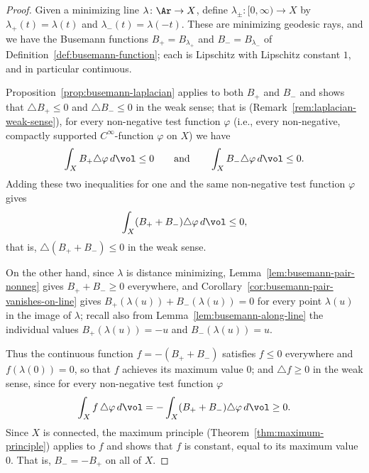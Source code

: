 \begin{proof}
Given a minimizing line $\lambda\colon \Ar\to X$, define
$\lambda_\pm\colon [0,\infty)\to X$ by $\lambda_+(t)=\lambda(t)$ and
$\lambda_-(t)=\lambda(-t)$. These are minimizing geodesic rays, and we have
the Busemann functions $B_+=B_{\lambda_+}$ and $B_-=B_{\lambda_-}$ of
Definition~\ref{def:busemann-function}; each is Lipschitz with Lipschitz
constant $1$, and in particular continuous.

Proposition~\ref{prop:busemann-laplacian} applies to both $B_+$ and $B_-$
and shows that $\triangle B_+\le 0$ and $\triangle B_-\le 0$ in the weak sense;
that is (Remark~\ref{rem:laplacian-weak-sense}), for every non-negative
test function $\varphi$ (i.e., every non-negative, compactly supported
$C^\infty$-function $\varphi$ on $X$) we have
$$\int_X B_+\triangle\varphi\,d\vol\le 0
\qquad\text{and}\qquad
\int_X B_-\triangle\varphi\,d\vol\le 0.$$
Adding these two inequalities for one and the same non-negative test
function $\varphi$ gives
$$\int_X (B_++B_-)\triangle\varphi\,d\vol\le 0,$$
that is, $\triangle(B_++B_-)\le 0$ in the weak sense.

On the other hand, since $\lambda$ is distance minimizing,
Lemma~\ref{lem:busemann-pair-nonneg} gives $B_++B_-\ge 0$
everywhere, and
Corollary~\ref{cor:busemann-pair-vanishes-on-line} gives
$B_+(\lambda(u))+B_-(\lambda(u))=0$ for every point $\lambda(u)$ in
the image of $\lambda$; recall also from
Lemma~\ref{lem:busemann-along-line} the individual values
$B_+(\lambda(u))=-u$ and $B_-(\lambda(u))=u$.

Thus the continuous function $f=-(B_++B_-)$ satisfies $f\le 0$ everywhere
and $f(\lambda(0))=0$, so that $f$ achieves its maximum value $0$; and
$\triangle f\ge 0$ in the weak sense, since for every non-negative test
function $\varphi$
$$\int_X f\,\triangle\varphi\,d\vol
=-\int_X (B_++B_-)\triangle\varphi\,d\vol\ge 0.$$
Since $X$ is connected, the maximum principle
(Theorem~\ref{thm:maximum-principle}) applies to $f$ and shows that $f$ is
constant, equal to its maximum value $0$. That is, $B_-=-B_+$ on all of
$X$.


\end{proof}
